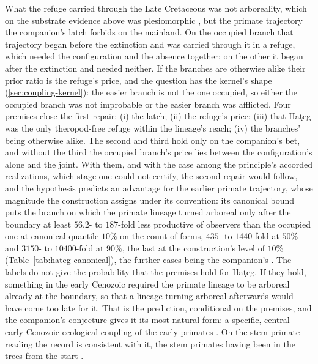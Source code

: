 \documentclass[11pt]{article}
\theoremstyle{definition}
\begin{document}
What the refuge carried through the Late Cretaceous was not arboreality, which on the substrate evidence above was plesiomorphic \cite{Hughes2021substrate}, but the primate trajectory the companion's latch forbids on the mainland. On the occupied branch that trajectory began before the extinction and was carried through it in a refuge, which needed the configuration and the absence together; on the other it began after the extinction and needed neither. If the branches are otherwise alike their prior ratio is the refuge's price, and the question has the kernel's shape (\autoref{sec:coupling-kernel}): the easier branch is not the one occupied, so either the occupied branch was not improbable or the easier branch was afflicted. Four premises close the first repair: (i) the latch; (ii) the refuge's price; (iii) that Ha\c{t}eg was the only theropod-free refuge within the lineage's reach; (iv) the branches' being otherwise alike. The second and third hold only on the companion's bet, and without the third the occupied branch's price lies between the configuration's alone and the joint. With them, and with the case among the principle's accorded realizations, which stage one could not certify, the second repair would follow, and the hypothesis predicts an advantage for the earlier primate trajectory, whose magnitude the construction assigns under its convention: its canonical bound puts the branch on which the primate lineage turned arboreal only after the boundary at least $56.2$- to $187$-fold less productive of observers than the occupied one at canonical quantile $10\%$ on the count of forms, $435$- to $1440$-fold at $50\%$ and $3150$- to $10400$-fold at $90\%$, the last at the construction's level of $10\%$ (Table~\ref{tab:hateg-canonical}), the further cases being the companion's \cite{Nexus}. The labels do not give the probability that the premises hold for Ha\c{t}eg. If they hold, something in the early Cenozoic required the primate lineage to be arboreal already at the boundary, so that a lineage turning arboreal afterwards would have come too late for it. That is the prediction, conditional on the premises, and the companion's conjecture gives it its most natural form: a specific, central early-Cenozoic ecological coupling of the early primates \cite{Nexus}. On the stem-primate reading the record is consistent with it, the stem primates having been in the trees from the start \cite{WilsonMantilla2021purgatoriids}.
\end{document}
